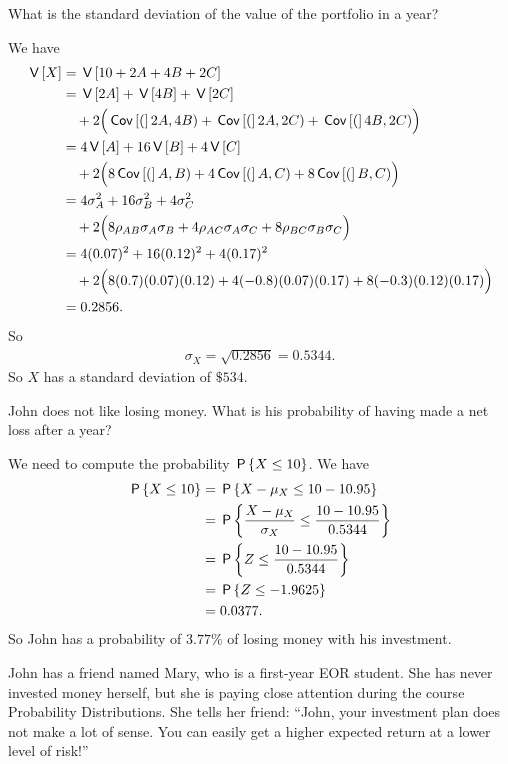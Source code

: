\documentclass[lectures]{subfiles}
\begin{document}
\begin{exercise}
What is the standard deviation of the value of the portfolio in a year?
\begin{solution}
We have
\begin{align}
    \V{X} &= \V{ 10 + 2A + 4B + 2C} \\
    &= \V{2A} + \V{4B} + \V{2C} \\
    &\quad +2\Big( \cov(2A, 4B) + \cov(2A, 2C) + \cov(4B, 2C) \Big) \\
    &= 4\V{A} + 16\V{B} + 4\V{C}\\
    &\quad +2\Big( 8\cov(A, B) + 4\cov(A, C) + 8\cov(B, C) \Big) \\
    &= 4\sigma_A^2 + 16\sigma_B^2 + 4\sigma_C^2 \\
    &\quad +2\Big( 8\rho_{AB}\sigma_A \sigma_B + 4\rho_{AC}\sigma_A \sigma_C + 8\rho_{BC}\sigma_B \sigma_C \Big) \\
    &= 4(0.07)^2 + 16(0.12)^2 + 4(0.17)^2 \\
    &\quad +2\Big( 8(0.7)(0.07) (0.12) + 4(-0.8)(0.07)(0.17) + 8(-0.3)(0.12) (0.17)\Big) \\
    &= 0.2856.
\end{align}
So
\begin{align}
    \sigma_X = \sqrt{0.2856} = 0.5344.
\end{align}
So $X$ has a standard deviation of $\$534$.
\end{solution}
\end{exercise}

\begin{exercise}
John does not like losing money. What is his probability of having made a net loss after a year?
\begin{solution}
We need to compute the probability $\P{X \leq 10}$. We have
\begin{align}
    \P{X \leq 10}
 &= \P{ X - \mu_X \leq 10 - 10.95} \\
    &= \P{ \frac{X - \mu_X}{\sigma_X} \leq \frac{10 - 10.95}{0.5344} } \\
    &= \P{ Z \leq \frac{10 - 10.95}{0.5344} } \\
    &= \P{ Z \leq -1.9625 } \\
    &= 0.0377.
\end{align}
So John has a probability of $3.77\%$ of losing money with his investment.
\end{solution}
\end{exercise}

John has a friend named Mary, who is a first-year EOR student. She has never invested money herself, but she is paying close attention during the course Probability Distributions. She tells her friend: ``John, your investment plan does not make a lot of sense. You can easily get a higher expected return at a lower level of risk!''
\end{document}
